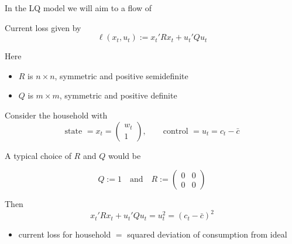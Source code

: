 \begin{frame}
    
    In the LQ model we will aim to  a flow of 
    
        \vspace{0.5em}
        \vspace{0.5em}
    Current loss given by 
    \begin{equation*}
        \ell(x_t, u_t) := x_t' R x_t + u_t' Q u_t
    \end{equation*}

        \vspace{0.5em}
    Here 
    \begin{itemize}
        \item $R$ is $n \times n$, symmetric and positive semidefinite
        \vspace{0.5em}
        \item $Q$ is $m \times m$, symmetric and positive definite
    \end{itemize}

\end{frame}


\begin{frame}
    
    \Eg Consider the household with 
    \begin{equation*}
        \text{state } = x_t = 
        \begin{pmatrix}
            w_t
            \\
            1
        \end{pmatrix},
        \qquad
        \text{control } = u_t = c_t - \bar c
    \end{equation*}
    
    A typical choice of $R$ and $Q$ would be 
    
    \begin{equation*}
        Q := 1
        \quad \text{and} \quad
        R :=
        \left(
        \begin{array}{cc}
        0 & 0 \\
        0 & 0
        \end{array}
        \right)
    \end{equation*}


    Then
    \begin{equation*}
        x_t' R x_t + u_t' Q u_t = u_t^2 = (c_t - \bar c)^2
    \end{equation*}

    \begin{itemize}
        \item current loss for household $=$ squared deviation of consumption from ideal 
    \end{itemize}

\end{frame}


